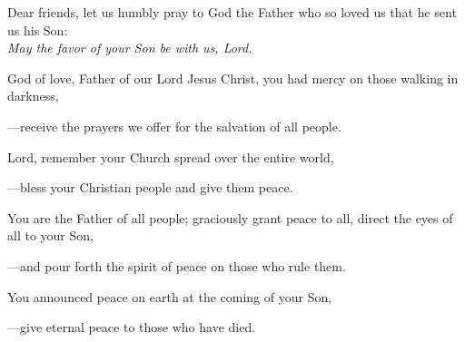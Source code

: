 \intercessions\indent

\begin{hangpar}

Dear friends, let us humbly pray to God the Father who so loved us that he sent us his Son:\\
\emph{May the favor of your Son be with us, Lord.}

\medskip God of love, Father of our Lord Jesus Christ, you had mercy on those walking in darkness,

{\color{red}---\thinspace}receive the prayers we offer for the salvation of all people.

\medskip Lord, remember your Church spread over the entire world,

{\color{red}---\thinspace}bless your Christian people and give them peace.

\medskip You are the Father of all people; graciously grant peace to all, direct the eyes of all to your Son,

{\color{red}---\thinspace}and pour forth the spirit of peace on those who rule them.

\medskip You announced peace on earth at the coming of your Son,

{\color{red}---\thinspace}give eternal peace to those who have died.

\medskip

\end{hangpar}